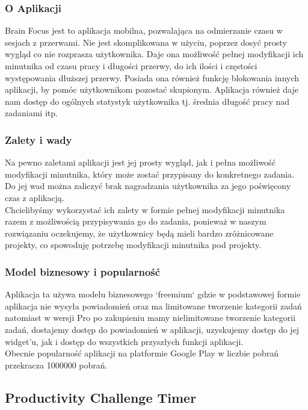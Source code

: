 \documentclass[a4paper,11pt]{report}
\begin{document}
\subsubsection{O Aplikacji}
Brain Focus jest to aplikacja mobilna, pozwalająca na odmierzanie czasu w sesjach z przerwami.
 Nie jest skomplikowana w użyciu, poprzez dosyć prosty wygląd co nie rozprasza użytkownika.
 Daje ona możliwość pełnej modyfikacji ich minutnika od czasu pracy i długości przerwy, do ich ilości i częstości występowania dłuższej przerwy.
 Posiada ona również funkcję blokowania innych aplikacji, by pomóc użytkownikom pozostać skupionym.
 Aplikacja również daje nam dostęp do ogólnych statystyk użytkownika tj. średnia długość pracy nad zadaniami itp.
\subsubsection{Zalety i wady}
Na pewno zaletami aplikacji jest jej prosty wygląd,
 jak i pełna możliwość modyfikacji minutnika,
 który może zostać przypisany do konkretnego zadania.
\vspace{0,5cm}
 \\Do jej wad można zaliczyć brak nagradzania użytkownika za jego poświęcony czas z aplikacją.
\vspace{0,5cm}
\\Chcielibyśmy wykorzystać ich zalety w formie pełnej modyfikacji minutnika razem z możliwością przypisywania go do zadania,
 ponieważ w naszym rozwiązaniu oczekujemy,
 że użytkownicy będą mieli bardzo zróżnicowane projekty, co spowoduję potrzebę modyfikacji minutnika pod projekty.
\subsubsection{Model biznesowy i popularność}
Aplikacja ta używa modelu biznesowego `freemium` gdzie w podstawowej formie aplikacja nie wysyła powiadomień
 oraz ma limitowane tworzenie kategorii zadań natomiast w wersji Pro
 po zakupieniu mamy nielimitowane tworzenie kategorii zadań,
 dostajemy dostęp do powiadomień w aplikacji,
 uzyskujemy dostęp do jej widget'u,
 jak i dostęp do wszystkich przyszłych funkcji aplikacji.
\vspace{0,5cm}\\Obecnie popularność aplikacji na platformie Google Play w liczbie pobrań przekracza 1000000 pobrań.
\subsection{Productivity Challenge Timer}
\end{document}
